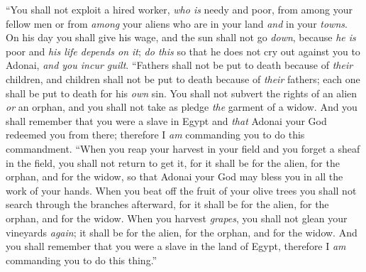 \begin{biblechapter}
\verse “You shall not exploit a hired worker, \textit{who is} needy and poor, from among your fellow men or from \textit{among} your aliens who are in your land \textit{and} in your \textit{towns}.
\verse On his day you shall give his wage, and the sun shall not go \textit{down}, because \textit{he is} poor and \textit{his life depends on it}; \textit{do this} so that he does not cry out against you to Adonai, \textit{and you incur guilt}.
\verse “Fathers shall not be put to death because of \textit{their} children, and children shall not be put to death because of \textit{their} fathers; each one shall be put to death for his \textit{own} sin.
\verse You shall not subvert the rights of an alien \textit{or} an orphan, and you shall not take as pledge \textit{the} garment of a widow.
\verse And you shall remember that you were a slave in Egypt and \textit{that} Adonai your God redeemed you from there; therefore I \textit{am} commanding you to do this commandment.
\verse “When you reap your harvest in your field and you forget a sheaf in the field, you shall not return to get it, for it shall be for the alien, for the orphan, and for the widow, so that Adonai your God may bless you in all the work of your hands.
\verse When you beat off the fruit of your olive trees you shall not search through the branches afterward, for it shall be for the alien, for the orphan, and for the widow.
\verse When you harvest \textit{grapes}, you shall not glean your vineyards \textit{again}; it shall be for the alien, for the orphan, and for the widow.
\verse And you shall remember that you were a slave in the land of Egypt, therefore I \textit{am} commanding you to do this thing.”
\end{biblechapter}

